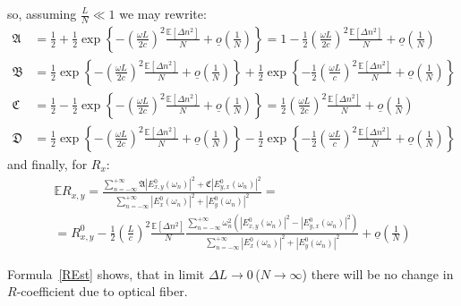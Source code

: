 \documentclass[12pt, notitlepage]{report}
\begin{document}
so, assuming $\frac{L}{N} \ll 1$ we may rewrite:
\begin{align*}
	\mathfrak{A} &= \frac{1}{2} + \frac{1}{2}\exp\left\{ -\left(\frac{\omega L}{2c}\right)^2\frac{\mathbb{E}\left[\Delta n^2\right]}{N} + \underline{o}\left(\frac{1}{N}\right) \right\} = 1 -\frac{1}{2}\left(\frac{\omega L}{2c}\right)^2\frac{\mathbb{E}\left[\Delta n^2\right]}{N} + \underline{o}\left(\frac{1}{N}\right) \\
	\mathfrak{B} &= \frac{1}{2}\exp\left\{ -\left(\frac{\omega L}{2c}\right)^2\frac{\mathbb{E}\left[\Delta n^2\right]}{N} + \underline{o}\left(\frac{1}{N}\right) \right\} + \frac{1}{2}\exp\left\{-\frac{1}{2} \left(\frac{\omega L}{c}\right)^2\frac{\mathbb{E}\left[\Delta n^2\right]}{N} + \underline{o}\left(\frac{1}{N}\right) \right\} \\
	\mathfrak{C} &= \frac{1}{2} - \frac{1}{2} \exp\left\{ -\left(\frac{\omega L}{2c}\right)^2\frac{\mathbb{E}\left[\Delta n^2\right]}{N} + \underline{o}\left(\frac{1}{N}\right) \right\} = \frac{1}{2}\left(\frac{\omega L}{2c}\right)^2\frac{\mathbb{E}\left[\Delta n^2\right]}{N} + \underline{o}\left(\frac{1}{N}\right) \\
	\mathfrak{D} &= \frac{1}{2}\exp\left\{ -\left(\frac{\omega L}{2c}\right)^2\frac{\mathbb{E}\left[\Delta n^2\right]}{N} + \underline{o}\left(\frac{1}{N}\right) \right\} - \frac{1}{2}\exp\left\{-\frac{1}{2} \left(\frac{\omega L}{c}\right)^2\frac{\mathbb{E}\left[\Delta n^2\right]}{N} + \underline{o}\left(\frac{1}{N}\right) \right\}
\end{align*}
and finally, for $R_x$:
\begin{multline}
	\label{REst}
	\mathbb{E}R_{x,y} = \frac{\sum\limits_{n=-\infty}^{+\infty} \mathfrak{A}\left|E^0_{x,y}(\omega_n)\right|^2 + \mathfrak{C}\left|E^0_{y,x}(\omega_n)\right|^2}{\sum\limits_{n=-\infty}^{+\infty} \left|E_x^0(\omega_n)\right|^2 + \left|E_y^0(\omega_n)\right|^2} = \\ =
	R^0_{x,y} - \frac{1}{2}\left(\frac{L}{c}\right)^2\frac{\mathbb{E}\left[\Delta n^2\right]}{N} \frac{\sum\limits_{n=-\infty}^{+\infty} \omega_n^2\left(\left|E^0_{x,y}(\omega_n)\right|^2 - \left|E^0_{y,x}(\omega_n)\right|^2\right)}{\sum\limits_{n=-\infty}^{+\infty} \left|E_x^0(\omega_n)\right|^2 + \left|E_y^0(\omega_n)\right|^2} + \underline{o}\left(\frac{1}{N}\right)
\end{multline}

Formula~\eqref{REst} shows, that in limit $\Delta L \rightarrow 0$\,($N\rightarrow \infty$) there will be no change in $R$-coefficient due to optical fiber.
\end{document}
